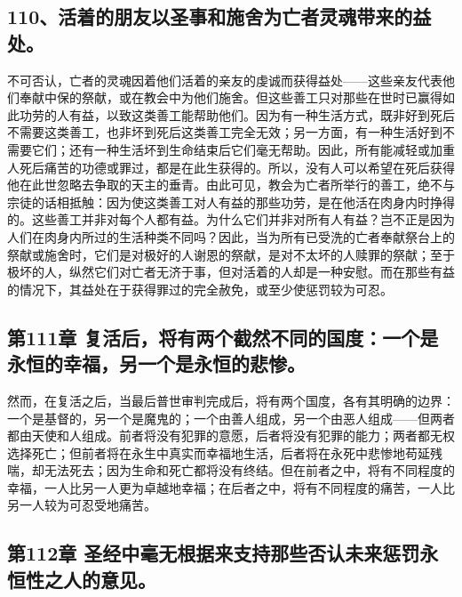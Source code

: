 
\subsection{110、活着的朋友以圣事和施舍为亡者灵魂带来的益处。}

不可否认，亡者的灵魂因着他们活着的亲友的虔诚而获得益处——这些亲友代表他们奉献中保的祭献，或在教会中为他们施舍。但这些善工只对那些在世时已赢得如此功劳的人有益，以致这类善工能帮助他们。因为有一种生活方式，既非好到死后不需要这类善工，也非坏到死后这类善工完全无效；另一方面，有一种生活好到不需要它们；还有一种生活坏到生命结束后它们毫无帮助。因此，所有能减轻或加重人死后痛苦的功德或罪过，都是在此生获得的。所以，没有人可以希望在死后获得他在此世忽略去争取的天主的垂青。由此可见，教会为亡者所举行的善工，绝不与宗徒的话相抵触：因为使这类善工对人有益的那些功劳，是在他活在肉身内时挣得的。这些善工并非对每个人都有益。为什么它们并非对所有人有益？岂不正是因为人们在肉身内所过的生活种类不同吗？因此，当为所有已受洗的亡者奉献祭台上的祭献或施舍时，它们是对极好的人谢恩的祭献，是对不太坏的人赎罪的祭献；至于极坏的人，纵然它们对亡者无济于事，但对活着的人却是一种安慰。而在那些有益的情况下，其益处在于获得罪过的完全赦免，或至少使惩罚较为可忍。\par


\subsection{第111章 复活后，将有两个截然不同的国度：一个是永恒的幸福，另一个是永恒的悲惨。}

然而，在复活之后，当最后普世审判完成后，将有两个国度，各有其明确的边界：一个是基督的，另一个是魔鬼的；一个由善人组成，另一个由恶人组成——但两者都由天使和人组成。前者将没有犯罪的意愿，后者将没有犯罪的能力；两者都无权选择死亡；但前者将在永生中真实而幸福地生活，后者将在永死中悲惨地苟延残喘，却无法死去；因为生命和死亡都将没有终结。但在前者之中，将有不同程度的幸福，一人比另一人更为卓越地幸福；在后者之中，将有不同程度的痛苦，一人比另一人较为可忍受地痛苦。\par


\subsection{第112章 圣经中毫无根据来支持那些否认未来惩罚永恒性之人的意见。}

